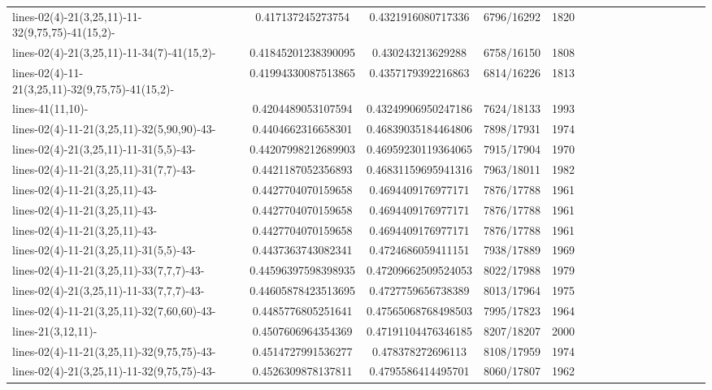\documentclass[12pt]{report}			%
\begin{document}
\begin{landscape}
\begin{longtable}{ | p{5cm} | *{15}{c|}}
lines-02(4)-21(3,25,11)-11-32(9,75,75)-41(15,2)-  & 0.417137245273754   & 0.4321916080717336  & 6796/16292  & 1820 \\
lines-02(4)-21(3,25,11)-11-34(7)-41(15,2)-        & 0.41845201238390095 & 0.430243213629288   & 6758/16150  & 1808 \\
lines-02(4)-11-21(3,25,11)-32(9,75,75)-41(15,2)-  & 0.41994330087513865 & 0.4357179392216863  & 6814/16226  & 1813 \\
lines-41(11,10)-                                  & 0.4204489053107594  & 0.43249906950247186 & 7624/18133  & 1993 \\
lines-02(4)-11-21(3,25,11)-32(5,90,90)-43-        & 0.4404662316658301  & 0.46839035184464806 & 7898/17931  & 1974 \\
lines-02(4)-21(3,25,11)-11-31(5,5)-43-            & 0.44207998212689903 & 0.46959230119364065 & 7915/17904  & 1970 \\
lines-02(4)-11-21(3,25,11)-31(7,7)-43-            & 0.4421187052356893  & 0.46831159695941316 & 7963/18011  & 1982 \\
lines-02(4)-11-21(3,25,11)-43-                    & 0.4427704070159658  & 0.4694409176977171  & 7876/17788  & 1961 \\
lines-02(4)-11-21(3,25,11)-43-                    & 0.4427704070159658  & 0.4694409176977171  & 7876/17788  & 1961 \\
lines-02(4)-11-21(3,25,11)-43-                    & 0.4427704070159658  & 0.4694409176977171  & 7876/17788  & 1961 \\
lines-02(4)-11-21(3,25,11)-31(5,5)-43-            & 0.4437363743082341  & 0.4724686059411151  & 7938/17889  & 1969 \\
lines-02(4)-11-21(3,25,11)-33(7,7,7)-43-         & 0.44596397598398935 & 0.47209662509524053 & 8022/17988  & 1979 \\
lines-02(4)-21(3,25,11)-11-33(7,7,7)-43-         & 0.44605878423513695 & 0.4727759656738389  & 8013/17964  & 1975 \\
lines-02(4)-11-21(3,25,11)-32(7,60,60)-43-        & 0.4485776805251641  & 0.47565068768498503 & 7995/17823  & 1964 \\
lines-21(3,12,11)-                                & 0.4507606964354369  & 0.47191104476346185 & 8207/18207  & 2000 \\
lines-02(4)-11-21(3,25,11)-32(9,75,75)-43-        & 0.4514727991536277  & 0.478378272696113   & 8108/17959  & 1974 \\
lines-02(4)-21(3,25,11)-11-32(9,75,75)-43-        & 0.4526309878137811  & 0.4795586414495701  & 8060/17807  & 1962 \\

\end{longtable}
\end{landscape}
\end{document}
